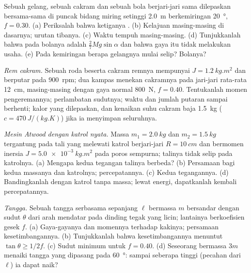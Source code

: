 \begin{exercise}[$\star\star$]\label{exo:b2:rigid-body-mechanics:5}
Sebuah gelang, sebuah cakram dan sebuah bola berjari-jari sama
dilepaskan bersama-sama di puncak bidang miring setinggi \qty{2.0}{m}
berkemiringan \qty{20}{\degree}, $f =
0.30$. (a) Periksalah bahwa ketiganya .
(b) Kelajuan masing-masing di dasarnya; urutan tibanya. (c) Waktu tempuh
masing-masing. (d) Tunjukkanlah bahwa  pada bolanya
adalah $\tfrac27Mg\sin\alpha$ dan bahwa gaya itu tidak melakukan usaha.
(e) Pada kemiringan berapa gelangnya mulai selip? Bolanya?
\end{exercise}

\begin{exercise}[$\star\star$]\label{exo:b2:rigid-body-mechanics:6}
\emph{Rem cakram.} Sebuah roda beserta cakram remnya mempunyai
$J = \qty{1.2}{kg.m^2}$ dan berputar pada \qty{900}{rpm}; dua kampas
menekan cakramnya pada jari-jari rata-rata \qty{12}{cm}, masing-masing
dengan gaya normal \qty{800}{N}, $f = 0.40$. Tentukanlah momen
pengeremannya; perlambatan sudutnya; waktu dan jumlah putaran sampai
berhenti; kalor yang dilepaskan, dan kenaikan suhu cakram baja
\qty{1.5}{kg} ($c = \qty{470}{J/(kg.K)}$) jika ia menyimpan seluruhnya.
\end{exercise}

\begin{exercise}[$\star\star$]\label{exo:b2:rigid-body-mechanics:7}
\emph{Mesin Atwood dengan katrol nyata.} Massa $m_1 = \qty{2.0}{kg}$ dan
$m_2 = \qty{1.5}{kg}$ tergantung pada tali yang melewati katrol
berjari-jari $R =
\qty{10}{cm}$ dan bermomen inersia $J = \qty{5.0e-3}{kg.m^2}$ pada poros
sempurna; talinya tidak selip pada katrolnya. (a) Mengapa kedua tegangan
talinya berbeda? (b) Persamaan bagi kedua massanya dan katrolnya;
percepatannya. (c) Kedua tegangannya. (d) Bandingkanlah dengan katrol
tanpa massa; lewat energi, dapatkanlah kembali percepatannya.
\end{exercise}

\begin{exercise}[$\star\star$]\label{exo:b2:rigid-body-mechanics:8}
\emph{Tangga.} Sebuah tangga serbasama sepanjang $\ell$ bermassa $m$
bersandar dengan sudut $\theta$ dari arah mendatar pada dinding tegak
yang licin; lantainya berkoefisien gesek $f$. (a) Gaya-gayanya dan
momennya terhadap kakinya; persamaan kesetimbangannya. (b) Tunjukkanlah
bahwa kesetimbangannya menuntut $\tan\theta \ge 1/2f$. (c) Sudut minimum
untuk $f = 0.40$. (d) Seseorang bermassa $3m$ menaiki tangga yang
dipasang pada \qty{60}{\degree}: sampai seberapa tinggi (pecahan dari
$\ell$) ia dapat naik?
\end{exercise}

